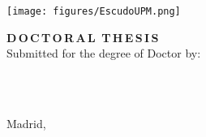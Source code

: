 \begin{center}
\begin{spacing}{1.3}
    \textbf{\large {\UNIVERSITY}}\\
    \textbf{\large {\UPMCentre}}\\
    \vspace{5mm}
\end{spacing}
    \texttt{[image: figures/EscudoUPM.png]}

\begin{spacing}{2.0}
\textbf{\LARGE {\thesisTitle}}
\end{spacing}

\vspace{15 mm}

\begin{spacing}{1.3}
\textbf{\LARGE {D\,O\,C\,T\,O\,R\,A\,L\, T\,H\,E\,S\,I\,S}}\\
\medskip
{\large {Submitted for the degree of Doctor by:}}
\end{spacing}
\end{center}


\begin{center}
\begin{spacing}{1.3}
\textbf{\Large {\thesisAuthor}}\\
{\large {\priorstudies}}\\
\end{spacing}
\end{center}

\vspace{\fill}

\begin{center}
   \large {Madrid, \thesisDate}
\end{center}